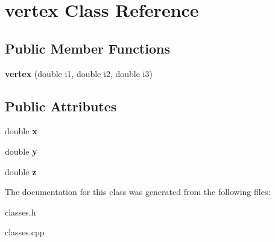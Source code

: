 \hypertarget{classvertex}{}\section{vertex Class Reference}
\label{classvertex}
\subsection*{Public Member Functions}
\begin{DoxyCompactItemize}
\item 
\mbox{\label{classvertex_a90609a1a7ca0891ece57daa80d7601b3}} 
{\bfseries vertex} (double i1, double i2, double i3)
\end{DoxyCompactItemize}
\subsection*{Public Attributes}
\begin{DoxyCompactItemize}
\item 
\mbox{\label{classvertex_a11f52ec2e920d56500baefe5a2e2bba7}} 
double {\bfseries x}
\item 
\mbox{\label{classvertex_a8b9f211498390a67c369fd43f3722a19}} 
double {\bfseries y}
\item 
\mbox{\label{classvertex_a4e4f9696a91e9bee75a4c15d8d77e064}} 
double {\bfseries z}
\end{DoxyCompactItemize}


The documentation for this class was generated from the following files\+:\begin{DoxyCompactItemize}
\item 
classes.\+h\item 
classes.\+cpp\end{DoxyCompactItemize}
